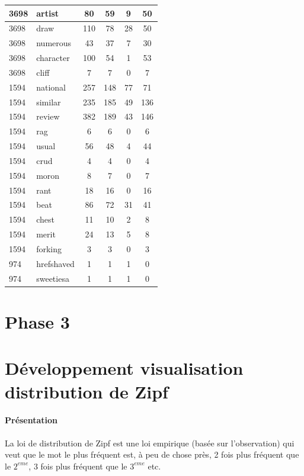 \documentclass[a4paper,12pt]{article}
\begin{document}
\begin{tabular}{|l|l|c|c|c|c|}
				\hline
				3698 & artist & 80 & 59 & 9 & 50 \\
				\hline
				3698 & draw & 110 & 78 & 28 & 50 \\
				\hline
				3698 & numerous & 43 & 37 & 7 & 30 \\
				\hline
				3698 & character & 100 & 54 & 1 & 53 \\
				\hline
				3698 & cliff & 7 & 7 & 0 & 7 \\
				\hline
				1594 & national & 257 & 148 & 77 & 71 \\
				\hline
				1594 & similar & 235 & 185 & 49 & 136 \\
				\hline
				1594 & review & 382 & 189 & 43 & 146 \\
				\hline
				1594 & rag & 6 & 6 & 0 & 6 \\
				\hline
				1594 & usual & 56 & 48 & 4 & 44 \\
				\hline
				1594 & crud & 4 & 4 & 0 & 4 \\
				\hline
				1594 & moron & 8 & 7 & 0 & 7 \\
				\hline
				1594 & rant & 18 & 16 & 0 & 16 \\
				\hline
				1594 & beat & 86 & 72 & 31 & 41 \\
				\hline
				1594 & chest & 11 & 10 & 2 & 8 \\
				\hline
				1594 & merit & 24 & 13 & 5 & 8 \\
				\hline
				1594 & forking & 3 & 3 & 0 & 3 \\
				\hline
				974 & hrefshaved & 1 & 1 & 1 & 0 \\
				\hline
				974 & sweetiesa & 1 & 1 & 1 & 0 \\
				\hline			
			\end{tabular}			 

\newpage
\section{Phase 3}


\newpage	
\appendix
\section{Développement visualisation distribution de Zipf}
	\label{sec:devZipf}
	\paragraph{Présentation}
		La loi de distribution de Zipf est une loi empirique (basée sur l'observation) qui veut que le mot le plus fréquent est, à peu de chose près, 2 fois plus fréquent que le $2^{eme}$, 3 fois plus fréquent que le $3^{eme}$ etc.\\
		
\end{document}

